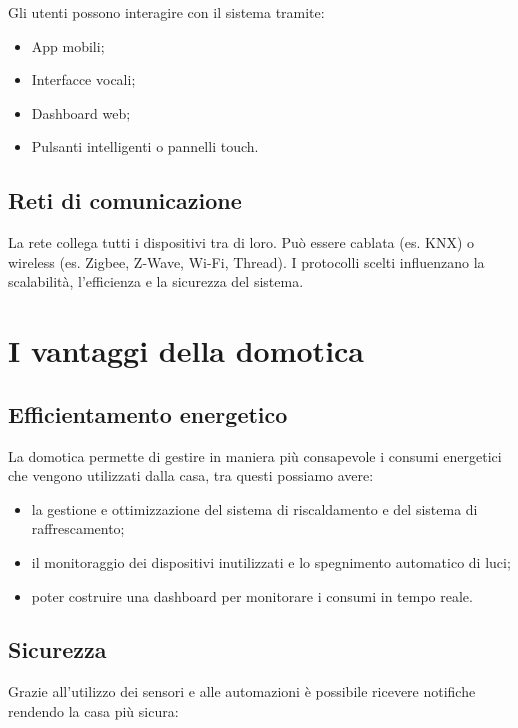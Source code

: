Gli utenti possono interagire con il sistema tramite:

\begin{itemize}
    \item App mobili;
    \item Interfacce vocali;
    \item Dashboard web;
    \item Pulsanti intelligenti o pannelli touch.
\end{itemize}

\subsection{Reti di comunicazione}

La rete collega tutti i dispositivi tra di loro. Può essere cablata (es. KNX) o wireless (es. Zigbee, Z-Wave, Wi-Fi, Thread). I protocolli scelti influenzano la scalabilità, l’efficienza e la sicurezza del sistema.

\section{I vantaggi della domotica}

\subsection{Efficientamento energetico}

La domotica permette di gestire in maniera più consapevole i consumi energetici che vengono utilizzati dalla casa, tra questi possiamo avere:

\begin{itemize}
    \item la gestione e ottimizzazione del sistema di riscaldamento e del sistema di raffrescamento;
    \item il monitoraggio dei dispositivi inutilizzati e lo spegnimento automatico di luci;
    \item poter costruire una dashboard per monitorare i consumi in tempo reale.
\end{itemize}

\subsection{Sicurezza}

Grazie all'utilizzo dei sensori e alle automazioni è possibile ricevere notifiche rendendo la casa più sicura:


